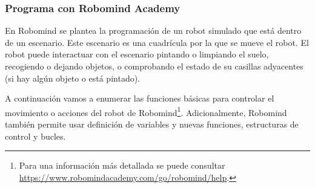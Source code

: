 \subsubsection{Programa con Robomind Academy}

En Robomind se plantea la programación de un robot simulado que está dentro de un escenario. Este escenario es una cuadrícula por la que se mueve el robot. El robot puede interactuar con el escenario pintando o limpiando el suelo, recogiendo o dejando objetos, o comprobando el estado de su casillas adyacentes (si hay algún objeto o está pintado).

A continuación vamos a enumerar las funciones básicas para controlar el movimiento o acciones del robot de Robomind\footnote{Para una información más detallada se puede consultar \url{https://www.robomindacademy.com/go/robomind/help}.}. Adicionalmente, Robomind también permite usar definición de variables y nuevas funciones, estructuras de control y bucles.


